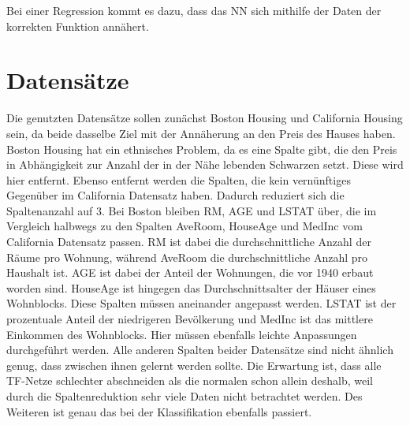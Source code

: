 Bei einer Regression kommt es dazu, dass das NN sich mithilfe 
der Daten der korrekten Funktion annähert.

\section{Datensätze}
    Die genutzten Datensätze sollen zunächst Boston Housing und California Housing sein, da 
    beide dasselbe Ziel mit der Annäherung an den Preis des Hauses haben. 
    Boston Housing hat ein ethnisches Problem, da es eine Spalte gibt, die den Preis in 
    Abhängigkeit zur Anzahl der in der Nähe lebenden Schwarzen setzt. Diese wird hier entfernt. 
    Ebenso entfernt werden die Spalten, die kein vernünftiges Gegenüber im California Datensatz 
    haben. Dadurch reduziert sich die Spaltenanzahl auf 3. Bei Boston bleiben RM, AGE und LSTAT 
    über, die im Vergleich halbwegs zu den Spalten AveRoom, HouseAge und MedInc vom California 
    Datensatz passen. 
    RM ist dabei die durchschnittliche Anzahl der Räume pro Wohnung, während AveRoom die 
    durchschnittliche Anzahl pro Haushalt ist. 
    AGE ist dabei der Anteil der Wohnungen, die vor 1940 erbaut worden sind. HouseAge ist 
    hingegen das Durchschnittsalter der Häuser eines Wohnblocks. Diese Spalten müssen 
    aneinander angepasst werden.
    LSTAT ist der prozentuale Anteil der niedrigeren Bevölkerung und MedInc ist das mittlere 
    Einkommen des Wohnblocks. Hier müssen ebenfalls leichte Anpassungen durchgeführt werden. 
    Alle anderen Spalten beider Datensätze sind nicht ähnlich genug, dass zwischen ihnen 
    gelernt werden sollte. Die Erwartung ist, dass alle TF-Netze schlechter abschneiden als die 
    normalen schon allein deshalb, weil durch die Spaltenreduktion sehr viele Daten nicht 
    betrachtet werden. Des Weiteren ist genau das bei der Klassifikation ebenfalls passiert.


